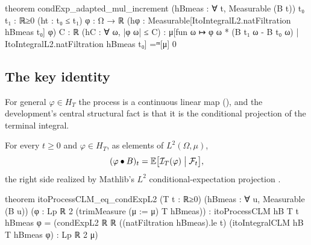 \documentclass[11pt]{article}
\newcommand{\HT}{H_T}
\newcommand{\bulletB}{\mathbin{\bullet}}
\begin{document}
\begin{leancode}[caption={Adapted weights kill future increments (\texttt{Foundations/ItoIntegralProcessMartingale}).},label=lst:condexp]
theorem condExp_adapted_mul_increment (hBmeas : ∀ t, Measurable (B t))
    {t₀ t₁ : ℝ≥0} (ht : t₀ ≤ t₁) {φ : Ω → ℝ}
    (hφ : Measurable[ItoIntegralL2.natFiltration hBmeas t₀] φ) {C : ℝ} (hC : ∀ ω, |φ ω| ≤ C) :
    μ[fun ω ↦ φ ω * (B t₁ ω - B t₀ ω) | ItoIntegralL2.natFiltration hBmeas t₀]
      =ᵐ[μ] 0
\end{leancode}

\subsection{The key identity}
For general $\varphi\in\HT$ the process is a continuous linear map (), and the development's
central structural fact is that it is the conditional projection of the terminal integral.

\begin{theorem}\label{thm:key}
For every $t\ge0$ and $\varphi\in\HT$, as elements of $L^2(\Omega,\mu)$,
\[
  (\varphi\bulletB B)_t=\E\bigl[\ito_T(\varphi)\bigm|\F_t\bigr],
\]
the right side realized by Mathlib's $L^2$ conditional-expectation projection .
\end{theorem}

\begin{leancode}[caption={The integral process is the conditional projection of its terminal value (\texttt{Foundations/ItoIntegralProcessGeneral}).},label=lst:key]
theorem itoProcessCLM_eq_condExpL2 (T t : ℝ≥0) (hBmeas : ∀ u, Measurable (B u))
    (φ : Lp ℝ 2 (trimMeasure (μ := μ) T hBmeas)) :
    itoProcessCLM hB T t hBmeas φ
      = (condExpL2 ℝ ℝ ((natFiltration hBmeas).le t)
          (itoIntegralCLM hB T hBmeas φ) : Lp ℝ 2 μ)
\end{leancode}
\end{document}
